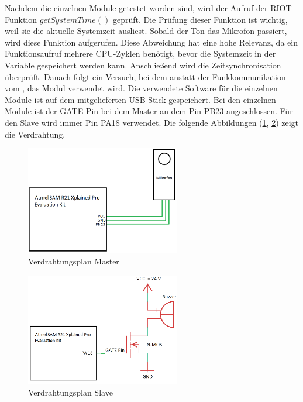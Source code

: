 Nachdem die einzelnen Module getestet worden sind, wird der Aufruf der RIOT Funktion $getSystemTime()$ geprüft. Die Prüfung dieser Funktion ist wichtig, weil sie die aktuelle Systemzeit ausliest. Sobald der Ton das Mikrofon passiert, wird diese Funktion aufgerufen. Diese Abweichung hat eine hohe Relevanz, da ein Funktionsaufruf mehrere CPU-Zyklen benötigt, bevor die Systemzeit in der Variable gespeichert werden kann. Anschließend wird die Zeitsynchronisation überprüft. Danach folgt ein Versuch, bei dem anstatt der Funkkommunikation vom \board \platz , das \funkempfaenger \platz Modul verwendet wird. Die verwendete Software für die einzelnen Module ist auf dem mitgelieferten USB-Stick gespeichert. Bei den einzelnen Module ist der \si{GATE}-Pin bei dem Master an dem Pin \si{PB23} angeschlossen. Für den Slave wird immer Pin \si{PA18} verwendet. Die folgende Abbildungen (\ref{img:verdrahtungsplan_master}, \ref{img:verdrahtungsplan_slave}) zeigt die Verdrahtung.

\begin{figure}[H]
	\centering
	\hspace*{-2cm}
	\includegraphics[width=0.6\textwidth]{images/schaltplan_master.png}
	\caption{Verdrahtungsplan Master}
	\label{img:verdrahtungsplan_master}
\end{figure}

\begin{figure}[H]
	\centering
	\hspace*{-2cm}
	\includegraphics[width=0.6\textwidth]{images/schaltplan_slave.png}
	\caption{Verdrahtungsplan Slave}
	\label{img:verdrahtungsplan_slave}
\end{figure}




